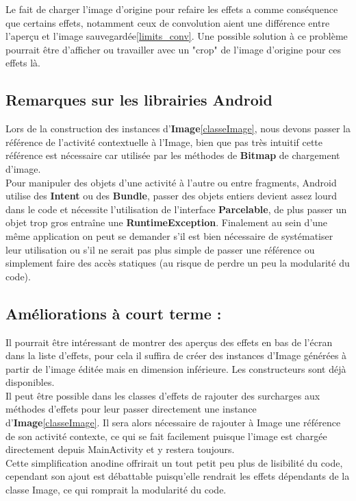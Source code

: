 Le fait de charger l'image d'origine pour refaire les effets a comme conséquence que certains effets, notamment ceux de convolution aient une différence entre l'aperçu et l'image sauvegardée\ref{limits_conv}. Une possible solution à ce problème pourrait être d'afficher ou travailler avec un "crop" de l'image d'origine pour ces effets là.
\\

\subsection{Remarques sur les librairies Android}
Lors de la construction des instances d'\textbf{Image}\ref{classeImage}, nous devons passer la référence de l'activité contextuelle à l'Image, bien que pas très intuitif cette référence est nécessaire car utilisée par les méthodes de \textbf{Bitmap} de chargement d'image.
\\

\label{parcelable}
Pour manipuler des objets d'une activité à l'autre ou entre fragments, Android utilise des \textbf{Intent} ou des \textbf{Bundle}, passer des objets entiers devient assez lourd dans le code et nécessite l'utilisation de l'interface \textbf{Parcelable}, de plus passer un objet trop gros entraîne une \textbf{RuntimeException}. Finalement au sein d'une même application on peut se demander s'il est bien nécessaire de systématiser leur utilisation ou s'il ne serait pas plus simple de passer une référence ou simplement faire des accès statiques (au risque de perdre un peu la modularité du code).

\subsection{Améliorations à court terme :}
Il pourrait être intéressant de montrer des aperçus des effets en bas de l'écran dans la liste d'effets, pour cela il suffira de créer des instances d'Image générées à partir de l'image éditée mais en dimension inférieure. Les constructeurs sont déjà disponibles.
\\

Il peut être possible dans les classes d'effets de rajouter des surcharges aux méthodes d'effets pour leur passer directement une instance d'\textbf{Image}\ref{classeImage}. Il sera alors nécessaire de rajouter à Image une référence de son activité contexte, ce qui se fait facilement puisque l'image est chargée directement depuis MainActivity et y restera toujours.
\\
Cette simplification anodine offrirait un tout petit peu plus de lisibilité du code, cependant son ajout est débattable puisqu'elle rendrait les effets dépendants de la classe Image, ce qui romprait la modularité du code.
\\

